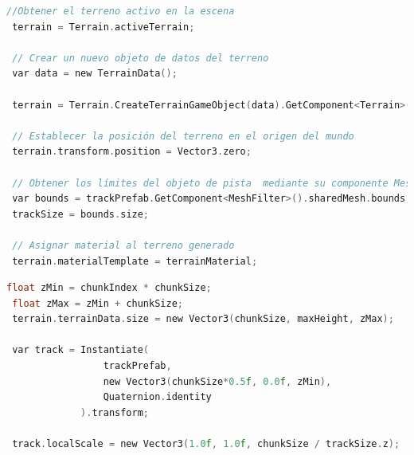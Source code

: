 \begin{center}
\begin{minipage}{0.8\textwidth}
\begin{lstlisting}[language=c, caption={Generar terreno.},label={hola}]
 //Obtener el terreno activo en la escena
 terrain = Terrain.activeTerrain;
 
 // Crear un nuevo objeto de datos del terreno
 var data = new TerrainData();

 terrain = Terrain.CreateTerrainGameObject(data).GetComponent<Terrain>();
 
 // Establecer la posición del terreno en el origen del mundo
 terrain.transform.position = Vector3.zero;     

 // Obtener los límites del objeto de pista  mediante su componente MeshFilter           
 var bounds = trackPrefab.GetComponent<MeshFilter>().sharedMesh.bounds;
 trackSize = bounds.size;
 
 // Asignar material al terreno generado
 terrain.materialTemplate = terrainMaterial;
\end{lstlisting}
\end{minipage}  
\end{center}

\begin{center}
\begin{minipage}{0.8\textwidth}
\begin{lstlisting}[language=c, caption={Generar pista.}]
 float zMin = chunkIndex * chunkSize;
 float zMax = zMin + chunkSize;
 terrain.terrainData.size = new Vector3(chunkSize, maxHeight, zMax);

 var track = Instantiate(
                 trackPrefab, 
                 new Vector3(chunkSize*0.5f, 0.0f, zMin), 
                 Quaternion.identity
             ).transform;

 track.localScale = new Vector3(1.0f, 1.0f, chunkSize / trackSize.z);
\end{lstlisting}
\end{minipage}  
\end{center}

